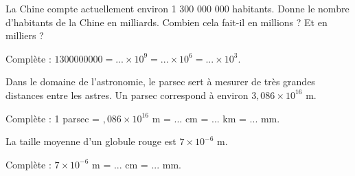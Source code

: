 \begin{activite}
\begin{partie}

La Chine compte actuellement environ 1 300 000 000 habitants. Donne le nombre d'habitants de la Chine en milliards. Combien cela fait-il en millions ? Et en milliers ?

Complète : $1 300 000 000 = ... \times 10^9 = ... \times 10^6 = ... \times 10^3$.
\end{partie}

\vspace{1em}
\begin{partie}

Dans le domaine de l'astronomie, le parsec sert à mesurer de très grandes distances entre les astres. Un parsec correspond à environ $3,086 \times 10^{16}$ m.

Complète : 1 parsec = $,086 \times 10^{16}$ m = ... cm = ... km = ... mm.
\end{partie}

\vspace{1em}
\begin{partie}

La taille moyenne d'un globule rouge est $7 \times 10^{-6}$ m.

Complète : $7 \times 10^{-6}$ m = ... cm = ... mm.
\end{partie}
\end{activite}

